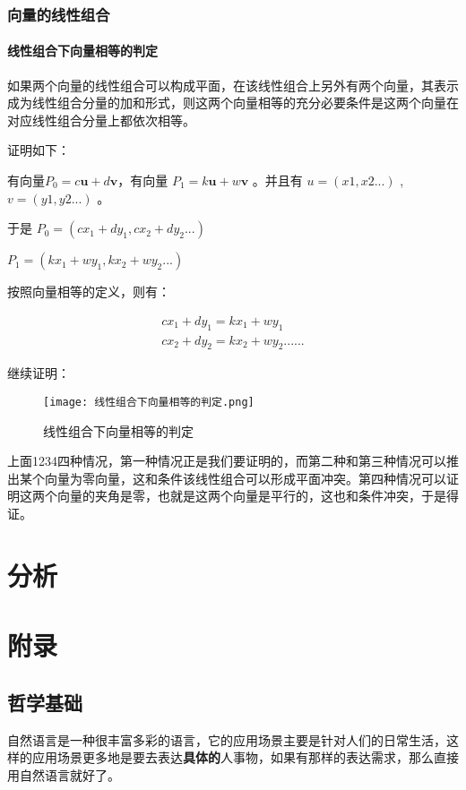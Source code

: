 \documentclass[12pt,oneside]{book}
\begin{document}
\section{向量的线性组合}

\subsection{线性组合下向量相等的判定}
如果两个向量的线性组合可以构成平面，在该线性组合上另外有两个向量，其表示成为线性组合分量的加和形式，则这两个向量相等的充分必要条件是这两个向量在对应线性组合分量上都依次相等。

证明如下：

有向量$P_0 = c\boldsymbol{u} + d\boldsymbol{v}$，有向量 $P_1 = k\boldsymbol{u} + w\boldsymbol{v}$ 。并且有 $u = (x1, x2...)$ , $v = (y1, y2...)$ 。

于是
$P_0 = (cx_1+dy_1, cx_2+dy_2...)$

$P_1 = (kx_1+wy_1, kx_2+wy_2...)$

按照向量相等的定义，则有：


\begin{align*}
cx_1+dy_1 = kx_1 + wy_1\\
cx_2+dy_2 = kx_2 + wy_2
......
\end{align*}

继续证明：
\begin{figure}[H]
\centering
\texttt{[image: 线性组合下向量相等的判定.png]}
\caption{线性组合下向量相等的判定}
\end{figure}

上面1234四种情况，第一种情况正是我们要证明的，而第二种和第三种情况可以推出某个向量为零向量，这和条件该线性组合可以形成平面冲突。第四种情况可以证明这两个向量的夹角是零，也就是这两个向量是平行的，这也和条件冲突，于是得证。

\part{分析}












\appendix

\part{附录}
\chapter{哲学基础}
自然语言是一种很丰富多彩的语言，它的应用场景主要是针对人们的日常生活，这样的应用场景更多地是要去表达\textbf{具体的}人事物，如果有那样的表达需求，那么直接用自然语言就好了。
\end{document}
